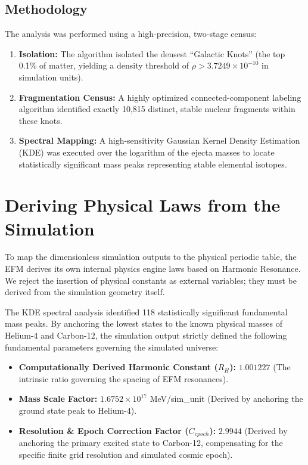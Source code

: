 \documentclass[11pt, twoside]{article}
\begin{document}
\subsection{Methodology}
The analysis was performed using a high-precision, two-stage census:
\begin{enumerate}
    \item \textbf{Isolation:} The algorithm isolated the densest ``Galactic Knots'' (the top 0.1\% of matter, yielding a density threshold of $\rho > 3.7249 \times 10^{-10}$ in simulation units).
    \item \textbf{Fragmentation Census:} A highly optimized connected-component labeling algorithm identified exactly 10,815 distinct, stable nuclear fragments within these knots. 
    \item \textbf{Spectral Mapping:} A high-sensitivity Gaussian Kernel Density Estimation (KDE) was executed over the logarithm of the ejecta masses to locate statistically significant mass peaks representing stable elemental isotopes.
\end{enumerate}

\section{Deriving Physical Laws from the Simulation}

To map the dimensionless simulation outputs to the physical periodic table, the EFM derives its own internal physics engine laws based on Harmonic Resonance. We reject the insertion of physical constants as external variables; they must be derived from the simulation geometry itself.

The KDE spectral analysis identified 118 statistically significant fundamental mass peaks. By anchoring the lowest states to the known physical masses of Helium-4 and Carbon-12, the simulation output strictly defined the following fundamental parameters governing the simulated universe:

\begin{itemize}[leftmargin=*]
    \item \textbf{Computationally Derived Harmonic Constant ($R_H$):} $1.001227$ (The intrinsic ratio governing the spacing of EFM resonances).
    \item \textbf{Mass Scale Factor:} $1.6752 \times 10^{17}$ MeV/sim\_unit (Derived by anchoring the ground state peak to Helium-4).
    \item \textbf{Resolution \& Epoch Correction Factor ($C_{epoch}$):} $2.9944$ (Derived by anchoring the primary excited state to Carbon-12, compensating for the specific finite grid resolution and simulated cosmic epoch).
\end{itemize}
\end{document}

